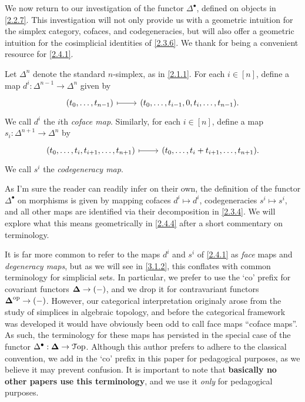 We now return to our investigation of the functor $\Delta^\bullet$, defined on objects in \cref{2.2.7}. This investigation will not only provide us with a geometric intuition for the simplex category, cofaces, and codegeneracies, but will also offer a geometric intuition for the cosimplicial identities of \cref{2.3.6}. We thank \cite{concise} for being a convenient resource for \cref{2.4.1}.

\begin{definition}\label{2.4.1}
    Let $\Delta^n$ denote the standard $n$-simplex, as in \cref{2.1.1}. For each $i\in[n]$, define a map $d^i : \Delta^{n-1}\to\Delta^n$ given by
    \[\begin{tikzcd}
    (t_0,\ldots,t_{n-1})\ar[mapsto, r] & (t_0,\ldots,t_{i-1},0,t_{i},\ldots,t_{n-1}).
    \end{tikzcd}\]
    We call $d^i$ the $i$th \emph{coface map}. Similarly, for each $i\in[n]$, define a map $s_i : \Delta^{n+1}\to\Delta^n$ by
    \[\begin{tikzcd}   
    (t_0,\ldots,t_i,t_{i+1},\ldots,t_{n+1})\ar[mapsto, r] & (t_0,\ldots,t_i+t_{i+1},\ldots,t_{n+1}).
    \end{tikzcd}\]
    We call $s^i$ the \emph{codegeneracy map}.
\end{definition}

\begin{remark}\label{2.4.2}
    As I'm sure the reader can readily infer on their own, the definition of the functor $\Delta^\bullet$ on morphisms is given by mapping cofaces $d^i\mapsto d^i$, codegeneracies $s^i\mapsto s^i$, and all other maps are identified via their decomposition in \cref{2.3.4}. We will explore what this means geometrically in \cref{2.4.4} after a short commentary on terminology.
\end{remark}

\begin{terminology}\label{2.4.3}
    It is far more common to refer to the maps $d^i$ and $s^i$ of \cref{2.4.1} as \emph{face} maps and \emph{degeneracy maps}, but as we will see in \cref{3.1.2}, this conflates with common terminology for simplicial sets. In particular, we prefer to use the `co' prefix for covariant functors $\boldsymbol{\Delta}\to (-)$, and we drop it for contravariant functors $\boldsymbol{\Delta}^{\mathrm{op}}\to(-)$. However, our categorical interpretation originaly arose from the study of simplices in algebraic topology, and before the categorical framework was developed it would have obviously been odd to call face maps ``coface maps''. As such, the terminology for these maps has persisted in the special case of the functor $\Delta^\bullet : \boldsymbol{\Delta}\to\mathcal{T}\mathrm{op}$. Although this author prefers to adhere to the classical convention, we add in the `co' prefix in this paper for pedagogical purposes, as we believe it may prevent confusion. It is important to note that \textbf{basically no other papers use this terminology}, and we use it \emph{only} for pedagogical purposes.
\end{terminology}


